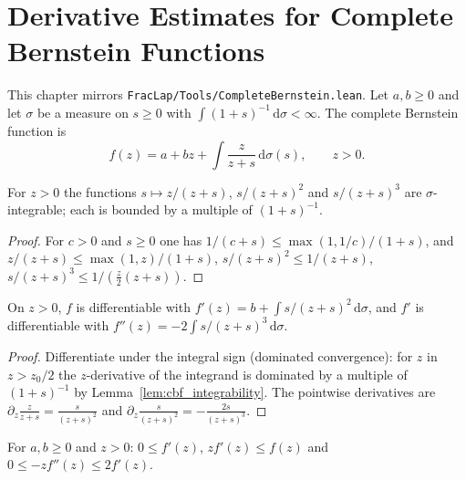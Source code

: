\chapter{Derivative Estimates for Complete Bernstein Functions}

This chapter mirrors \texttt{FracLap/Tools/CompleteBernstein.lean}. Let $a, b \ge 0$ and let $\sigma$ be a measure on $s \ge 0$ with $\int (1+s)^{-1}\, \mathrm{d}\sigma < \infty$. The complete Bernstein function is
\[
  f(z) = a + b z + \int \frac{z}{z + s}\, \mathrm{d}\sigma(s), \qquad z > 0.
\]

\begin{lemma}\label{lem:cbf_integrability}
\leanok
For $z > 0$ the functions $s \mapsto z/(z+s)$, $s/(z+s)^2$ and $s/(z+s)^3$ are $\sigma$-integrable; each is bounded by a multiple of $(1+s)^{-1}$.
\end{lemma}

\begin{proof}
\leanok
For $c > 0$ and $s \ge 0$ one has $1/(c+s) \le \max(1, 1/c)/(1+s)$, and $z/(z+s) \le \max(1, z)/(1+s)$, $s/(z+s)^2 \le 1/(z+s)$, $s/(z+s)^3 \le 1/(\tfrac z2 (z+s))$.
\end{proof}

\begin{theorem}[Differentiation]\label{thm:cbf_derivatives}
\leanok
On $z > 0$, $f$ is differentiable with $f'(z) = b + \int s/(z+s)^2\, \mathrm{d}\sigma$, and $f'$ is differentiable with $f''(z) = -2\int s/(z+s)^3\, \mathrm{d}\sigma$.
\end{theorem}

\begin{proof}
\leanok
Differentiate under the integral sign (dominated convergence): for $z$ in $z > z_0/2$ the $z$-derivative of the integrand is dominated by a multiple of $(1+s)^{-1}$ by Lemma~\ref{lem:cbf_integrability}. The pointwise derivatives are $\partial_z \frac{z}{z+s} = \frac{s}{(z+s)^2}$ and $\partial_z \frac{s}{(z+s)^2} = -\frac{2s}{(z+s)^3}$.
\end{proof}

\begin{theorem}\label{thm:cbf_estimates}
\leanok
For $a, b \ge 0$ and $z > 0$: $0 \le f'(z)$, $z f'(z) \le f(z)$ and $0 \le -z f''(z) \le 2 f'(z)$.
\end{theorem}


